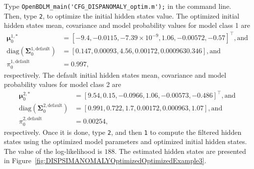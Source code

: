 Type \colorbox{light-gray}{\lstinline[basicstyle = \mlttfamily \small, backgroundcolor = \color{light-gray}]!OpenBDLM_main('CFG_DISPANOMALY_optim.m');!} in the \MATLAB{} command line.
Then, type  \colorbox{light-gray}{\lstinline[basicstyle = \mlttfamily \small, backgroundcolor = \color{light-gray}]!2!}, to optimize the initial hidden states value.
The optimized initial hidden states mean, covariance  and model probability values for model class 1 are 
\begin{align*}
 \bm \mu^{1,\text{*}}_{0} & = [	-9.4,  	-0.0115,	-7.39\times10^{-9},	1.06  ,	-0.00572	, -0.57     ]^{\intercal}, \text{and} \\
 \text{diag}(\bm\Sigma^{1,\text{default}}_{0})  & = [	0.147 ,	0.00093,	4.56 , 	0.00172,	0.000963	0.346      ],  \text{and} \\
 \pi_{0}^{1,\text{default}} & = 0.997,
\end{align*}
respectively.
The default initial hidden states mean, covariance  and model probability values for model class 2 are 
\begin{align*}
 \bm \mu^{2,\text{*}}_{0} & = [	9.54 	, 0.15  ,	-0.0966,	1.06  ,-0.00573, 	-0.486       ]^{\intercal}, \text{and} \\
 \text{diag}(\bm\Sigma^{2,\text{default}}_{0})  & = [	0.991 ,	0.722 ,	1.7  , 	0.00172	, 0.000963,	1.07     ], \text{and} \\
 \pi_{0}^{2,\text{default}} & = 0.00254,
\end{align*}
respectively.
Once it is done, type  \colorbox{light-gray}{\lstinline[basicstyle = \mlttfamily \small, backgroundcolor = \color{light-gray}]!2!}, and then  \colorbox{light-gray}{\lstinline[basicstyle = \mlttfamily \small, backgroundcolor = \color{light-gray}]!1!} to compute the filtered hidden states using the optimized model parameters and optimized initial hidden states.
The value of the log-likelihood is $188$.
The estimated hidden states are presented in Figure~\ref{fig:DISPSIMANOMALYOptimizedOptimizedExample3}.



